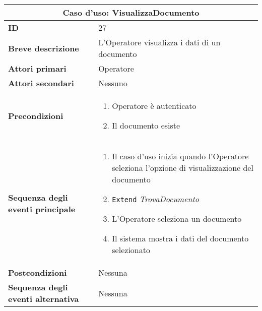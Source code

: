 \documentclass[a4paper]{report}
\begin{document}
\clearpage
\begin{table}[H]
\vspace*{-0cm}
\renewcommand{\arraystretch}{1.9}
\begin{tabular}{|p{3.9cm}|p{9.9cm}|}
\hline
\multicolumn{2}{|c|}{\textbf{Caso d’uso: VisualizzaDocumento}} \\ \hline
	\textbf{ID} & 27 \\ \hline
	\textbf{Breve descrizione} & L’Operatore visualizza i dati di un documento \\ \hline
	\textbf{Attori primari} & Operatore \\ \hline
	\textbf{Attori secondari} & Nessuno \\ \hline
	\textbf{Precondizioni} & \begin{enumerate}[leftmargin=14pt,label=\arabic*.,labelsep=0.5em,topsep=0pt,partopsep=0pt,parsep=0pt,itemsep=0pt]
        \item Operatore è autenticato
        \item Il documento esiste
    \end{enumerate} \\ \hline
	\textbf{Sequenza degli eventi principale} &
    \begin{enumerate}[leftmargin=14pt,label=\arabic*.,labelsep=0.5em,topsep=0pt,partopsep=0pt,parsep=0pt,itemsep=0pt]
        \item Il caso d’uso inizia quando l’Operatore seleziona l'opzione di visualizzazione del documento
        \item \texttt{Extend} \textit{TrovaDocumento}
        \item L'Operatore seleziona un documento
        \item Il sistema mostra i dati del documento selezionato
    \end{enumerate} \\ \hline
	\textbf{Postcondizioni} & Nessuna \\ \hline
	\textbf{Sequenza degli eventi alternativa} & Nessuna \\ \hline
\end{tabular}
\end{table}
\end{document}
